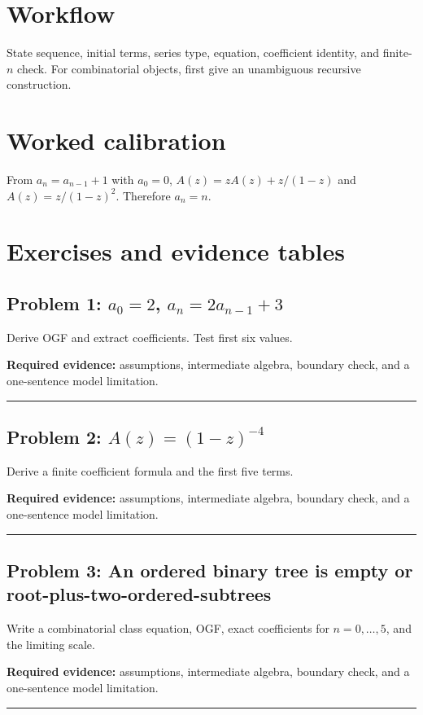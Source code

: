 \documentclass[11pt]{article}
\begin{document}
\makedoctocpage
\section{Workflow}
State sequence, initial terms, series type, equation, coefficient identity, and finite-$n$ check. For combinatorial objects, first give an unambiguous recursive construction.
\section{Worked calibration}
From $a_n=a_{n-1}+1$ with $a_0=0$, $A(z)=zA(z)+z/(1-z)$ and $A(z)=z/(1-z)^2$. Therefore $a_n=n$.

\section{Exercises and evidence tables}
\subsection{\texorpdfstring{Problem 1: $a_0=2$, $a_n=2a_{n-1}+3$}{Problem 1: First-order affine recurrence}}
Derive OGF and extract coefficients. Test first six values.\par
\textbf{Required evidence:} assumptions, intermediate algebra, boundary check, and a one-sentence model limitation.\par
\vspace{1.2cm}\hrule\vspace{0.4cm}
\subsection{\texorpdfstring{Problem 2: $A(z)=(1-z)^{-4}$}{Problem 2: Generating function with a fourth-order pole}}
Derive a finite coefficient formula and the first five terms.\par
\textbf{Required evidence:} assumptions, intermediate algebra, boundary check, and a one-sentence model limitation.\par
\vspace{1.2cm}\hrule\vspace{0.4cm}
\subsection{Problem 3: An ordered binary tree is empty or root-plus-two-ordered-subtrees}
Write a combinatorial class equation, OGF, exact coefficients for $n=0,\ldots,5$, and the limiting scale.\par
\textbf{Required evidence:} assumptions, intermediate algebra, boundary check, and a one-sentence model limitation.\par
\vspace{1.2cm}\hrule\vspace{0.4cm}
\end{document}
